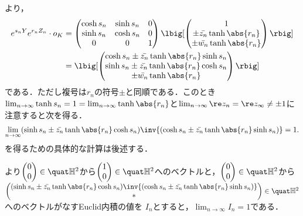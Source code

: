 \begin{npfwn}
  より， 
  \begin{align*}
    e^{s_n Y}e^{r_n Z_n}\cdot o_K &=
    \begin{pmatrix}
      \cosh s_n & \sinh s_n & 0 \\
      \sinh s_n & \cosh s_n & 0 \\
      0 & 0 & 1 
    \end{pmatrix}
              \lbig[\begin{pmatrix}
                1\\ \pm \bar{z_n} \tanh \abs{r_n}  \\ \pm \bar{w_n} \tanh \abs{r_n}
              \end{pmatrix}\rbig]\\
    &=  \lbig[ \begin{pmatrix}
      \cosh s_n \pm \bar{z_n} \tanh \abs{r_n} \sinh s_n \\ \sinh s_n \pm \bar{z_n} \tanh \abs{r_n} \cosh s_n \\ \pm \bar{w_n} \tanh \abs{r_n}
    \end{pmatrix}\rbig]
  \end{align*}
  である．ただし複号は$r_n$の符号$\pm$と同順である．このとき$\lim_{n\to \infty}\tanh s_n = 1 = \lim_{n\to \infty}\tanh \abs{r_n} $と$\lim_{n\to \infty} \re z_n = \re z_{\infty} \neq \pm 1$に注意すると次を得る．
  \begin{align}
    \lim_{n\to \infty}(\sinh s_n \pm \bar{z_n} \tanh \abs{r_n} \cosh s_n)\inv{(\cosh s_n \pm \bar{z_n} \tanh \abs{r_n} \sinh s_n) } = 1.\label{eq:-1}
  \end{align}
  を得るための具体的な計算は後述する．

  より$
  \begin{pmatrix}
    0 \\ 0 
  \end{pmatrix}
  \in \quat\mathbb{H}^2 $から$
  \begin{pmatrix}
    1 \\ 0 
  \end{pmatrix}
  \in \quat\mathbb{H}^2 $へのベクトルと，$
  \begin{pmatrix}
    0 \\ 0 
  \end{pmatrix}
  \in \quat\mathbb{H}^2 $から\\
  $ \begin{pmatrix}
    (\sinh s_n \pm \bar{z_n} \tanh \abs{r_n} \cosh s_n)\inv{(\cosh s_n \pm \bar{z_n} \tanh \abs{r_n} \sinh s_n) } \\  \ast 
  \end{pmatrix}\in \quat\mathbb{H}^2 $へのベクトルがなすEuclid内積の値を $I_n$とすると，$\lim_{n\to \infty}I_n = 1 $である．


\end{npfwn}
